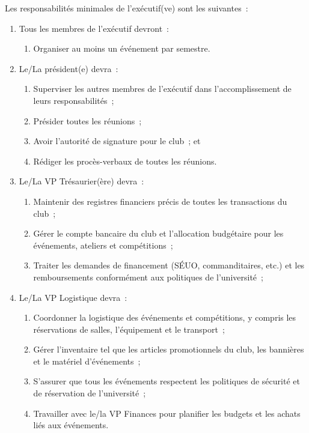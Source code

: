 Les responsabilités minimales de l'exécutif(ve) sont les suivantes~:
\begin{enumerate}
    \item Tous les membres de l'exécutif devront~:
    \begin{enumerate}
      \item Organiser au moins un événement par semestre.
    \end{enumerate}
    \item Le/La président(e) devra~:
    \begin{enumerate}
        \item Superviser les autres membres de l'exécutif dans l'accomplissement de leurs
              responsabilités~;
        \item Présider toutes les réunions~;
        \item Avoir l'autorité de signature pour le club~; et
        \item Rédiger les procès-verbaux de toutes les réunions.
    \end{enumerate}

    \item Le/La VP Trésaurier(ère) devra~:  %
    \begin{enumerate}
      \item Maintenir des registres financiers précis de toutes les transactions du club~;
      \item Gérer le compte bancaire du club et l'allocation budgétaire pour les événements, ateliers et compétitions~;
      \item Traiter les demandes de financement (SÉUO, commanditaires, etc.) et les remboursements conformément aux politiques de l'université~;
    \end{enumerate}


    \item Le/La VP Logistique devra~:  %
    \begin{enumerate}
      \item Coordonner la logistique des événements et compétitions, y compris
          les réservations de salles, l'équipement et le transport~;
      \item Gérer l'inventaire tel que les articles promotionnels du club, les
          bannières et le matériel d'événements~;
      \item S'assurer que tous les événements respectent les politiques de
          sécurité et de réservation de l'université~;
      \item Travailler avec le/la VP Finances pour planifier les budgets et les
          achats liés aux événements.
    \end{enumerate}


\end{enumerate}
